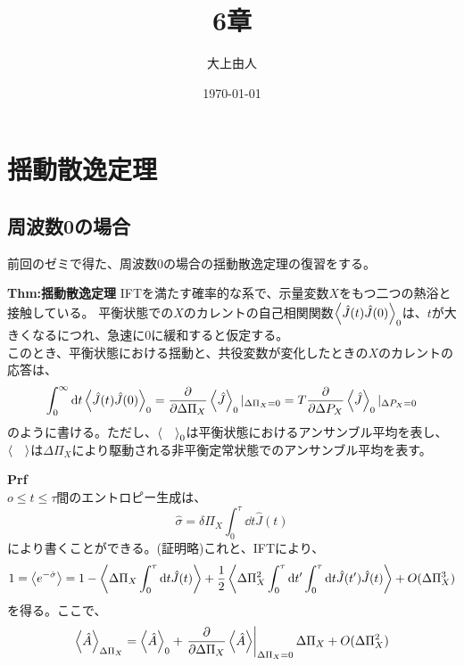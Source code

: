 \documentclass[a4paper,11pt]{jsarticle}
\begin{document}
\title{6章}
\author{大上由人}
\date{\today}
\maketitle
\section{揺動散逸定理}
\subsection{周波数0の場合}
前回のゼミで得た、周波数0の場合の揺動散逸定理の復習をする。\\
\begin{itembox}[l]{\textbf{Thm:揺動散逸定理}}
    IFTを満たす確率的な系で、示量変数$X$をもつ二つの熱浴と接触している。
        平衡状態での$X$のカレントの自己相関関数$\ev{\hat{J}(t)\hat{J}(0)}_0$は、$t$が大きくなるにつれ、急速に0に緩和すると仮定する。\\
        このとき、平衡状態における揺動と、共役変数が変化したときの$X$のカレントの応答は、
        \begin{equation}
        \int_{0}^{\infty} \dd t \ev{\hat{J}(t)\hat{J}(0)}_0 = \pdv{\Delta \Pi_X} \ev{\hat{J}}_0|_{\Delta \Pi_X = 0} =T\pdv{\Delta P_X} \ev{\hat{J}}_0|_{\Delta P_X = 0}
        \end{equation}
        のように書ける。ただし、$\ev{\quad}_0$は平衡状態におけるアンサンブル平均を表し、$\ev{\quad}$は$\Delta \Pi_X$により駆動される非平衡定常状態でのアンサンブル平均を表す。
    \end{itembox}
    \textbf{Prf}\\
    $o \leq t \leq \tau$間のエントロピー生成は、
    \begin{equation}
        \hat{\sigma} = \delta \Pi_X \int_{0}^{\tau} \dd t \hat{J}(t) 
    \end{equation}
    により書くことができる。(証明略)これと、IFTにより、
    \begin{align}
        1=\ev{e^{-\hat{\sigma}}}&=1-\ev{\Delta \Pi_X \int_{0}^{\tau} \dd t \hat{J}(t)} + \frac{1}{2}\ev{\Delta \Pi_X ^2 \int_{0}^{\tau} \dd t' \int_{0}^{\tau} \dd t \hat{J}(t')\hat{J}(t)} + O(\Delta \Pi_X ^3)\\
    \end{align}
    を得る。ここで、
    \begin{equation}
        \ev{\hat{A}}_{\Delta \Pi_X} = \ev{\hat{A}}_0 + \left.\pdv{\Delta \Pi_X} \ev{\hat{A}}\right|_{\Delta \Pi_X = 0} \Delta \Pi_X + O(\Delta \Pi_X ^2)
    \end{equation}
\end{document}
